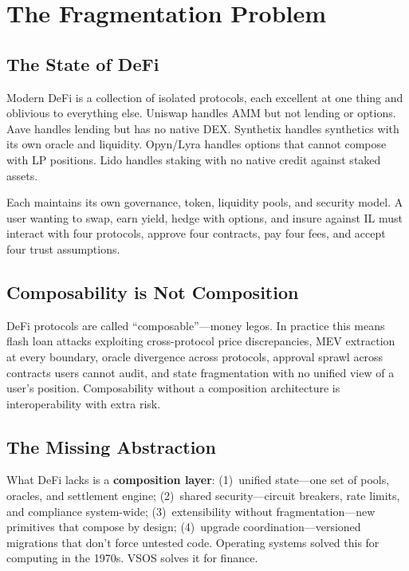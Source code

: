 \documentclass[9pt, letterpaper]{article}
\begin{document}

\section{The Fragmentation Problem}

\subsection{The State of DeFi}

Modern DeFi is a collection of isolated protocols, each excellent at one thing and oblivious to everything else. Uniswap handles AMM but not lending or options. Aave handles lending but has no native DEX. Synthetix handles synthetics with its own oracle and liquidity. Opyn/Lyra handles options that cannot compose with LP positions. Lido handles staking with no native credit against staked assets.

Each maintains its own governance, token, liquidity pools, and security model. A user wanting to swap, earn yield, hedge with options, and insure against IL must interact with four protocols, approve four contracts, pay four fees, and accept four trust assumptions.

\subsection{Composability is Not Composition}

DeFi protocols are called ``composable''---money legos. In practice this means flash loan attacks exploiting cross-protocol price discrepancies, MEV extraction at every boundary, oracle divergence across protocols, approval sprawl across contracts users cannot audit, and state fragmentation with no unified view of a user's position. Composability without a composition architecture is interoperability with extra risk.

\subsection{The Missing Abstraction}

What DeFi lacks is a \textbf{composition layer}: (1)~unified state---one set of pools, oracles, and settlement engine; (2)~shared security---circuit breakers, rate limits, and compliance system-wide; (3)~extensibility without fragmentation---new primitives that compose by design; (4)~upgrade coordination---versioned migrations that don't force untested code. Operating systems solved this for computing in the 1970s. VSOS solves it for finance.
\end{document}
